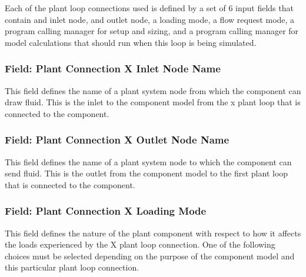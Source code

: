Each of the plant loop connections used is defined by a set of 6 input fields that contain and inlet node, and outlet node, a loading mode, a flow request mode, a program calling manager for setup and sizing, and a program calling manager for model calculations that should run when this loop is being simulated.

\subsubsection{Field: Plant Connection X Inlet Node Name}\label{field-plant-connection-x-inlet-node-name}

This field defines the name of a plant system node from which the component can draw fluid. This is the inlet to the component model from the x plant loop that is connected to the component.

\subsubsection{Field: Plant Connection X Outlet Node Name}\label{field-plant-connection-x-outlet-node-name}

This field defines the name of a plant system node to which the component can send fluid. This is the outlet from the component model to the first plant loop that is connected to the component.

\subsubsection{Field: Plant Connection X Loading Mode}\label{field-plant-connection-x-loading-mode}

This field defines the nature of the plant component with respect to how it affects the loads experienced by the X plant loop connection. One of the following choices must be selected depending on the purpose of the component model and this particular plant loop connection.

